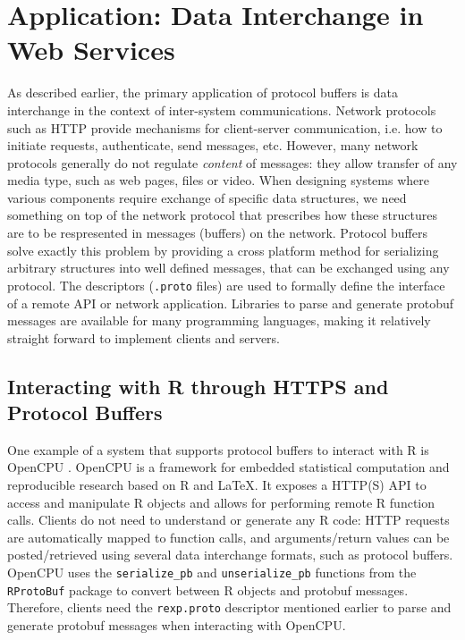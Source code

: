 \documentclass[article]{jss}
\begin{document}
\section{Application: Data Interchange in Web Services}


As described earlier, the primary application of protocol buffers is
data interchange in the context of inter-system communications. 
Network protocols such as HTTP provide mechanisms for client-server
communication, i.e. how to initiate requests, authenticate, send messages, 
etc.  However, many network 
protocols generally do not regulate \emph{content} of messages: they allow
transfer of any media type, such as web pages, files or video.
When designing systems where various components require exchange of specific data
structures, we need something on top of the network protocol that prescribes 
how these structures are to be respresented in messages (buffers) on the
network. Protocol buffers solve exactly this problem by providing
a cross platform method for serializing arbitrary structures into well defined
messages, that can be exchanged using any protocol. The descriptors
(\texttt{.proto} files) are used to formally define the interface of a
remote API or network application. Libraries to parse and generate protobuf
messages are available for many programming languages, making it 
relatively straight forward to implement clients and servers.

\subsection{Interacting with R through HTTPS and Protocol Buffers}

One example of a system that supports protocol buffers to interact
with R is OpenCPU \citep{opencpu}. OpenCPU is a framework for embedded statistical 
computation and reproducible research based on R and \LaTeX. It exposes a 
HTTP(S) API to access and manipulate R objects and allows for performing 
remote R function calls. Clients do not need to understand 
or generate any R code: HTTP requests are automatically mapped to 
function calls, and arguments/return values can be posted/retrieved
using several data interchange formats, such as protocol buffers.  
OpenCPU uses the \texttt{serialize\_pb} and \texttt{unserialize\_pb} functions
from the \texttt{RProtoBuf} package to convert between R objects and protobuf
messages. Therefore, clients need the \texttt{rexp.proto} descriptor mentioned
earlier to parse and generate protobuf messages when interacting with OpenCPU.
\end{document}
